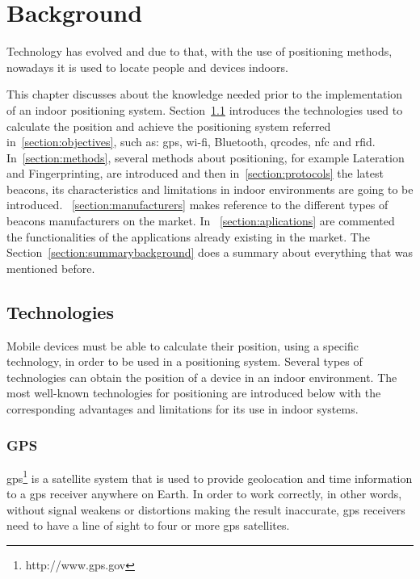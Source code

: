 \chapter{Background}
\label{chapter:background}

Technology has evolved and due to that, with the use of positioning methods, nowadays it is used to locate people and devices indoors. 

This chapter discusses about the knowledge needed prior to the implementation of an indoor positioning system. Section~\ref{section:Technologies} introduces the technologies used to calculate the position and achieve the positioning system referred in~\ref{section:objectives}, such as: \gls{gps}, \gls{wi-fi}, Bluetooth, \gls{qrcodes}, \gls{nfc} and \gls{rfid}.
In~\ref{section:methods}, several methods about positioning, for example Lateration and Fingerprinting, are introduced and then in~\ref{section:protocols} the latest beacons, its characteristics and limitations in indoor environments are going to be introduced. ~\ref{section:manufacturers} makes reference to the different types of beacons manufacturers on the market. In ~\ref{section:aplications} are commented the functionalities of the applications already existing in the market. The Section~\ref{section:summarybackground} does a summary about everything that was mentioned before.


\section{Technologies}
\label{section:Technologies}
Mobile devices must be able to calculate their position, using a specific technology, in order to be used in a positioning system. Several types of technologies can obtain the position of a device in an indoor environment.
The most well-known technologies for positioning are introduced below with the corresponding advantages and limitations for its use in indoor systems.

\subsection{GPS}
\label{subsection:gps}

\gls{gps}\footnote{http://www.gps.gov} is a satellite system that is used to provide geolocation and time information to a \gls{gps} receiver anywhere on Earth.
In order to work correctly, in other words, without signal weakens or distortions making the result inaccurate, \gls{gps} receivers need to have a line of sight to four or more \gls{gps} satellites.

